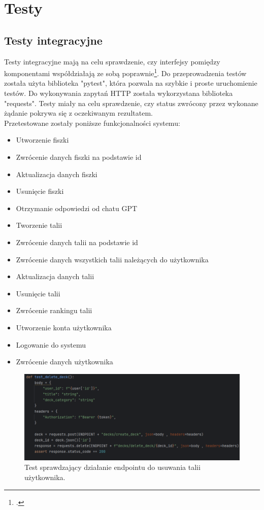 \chapter{Testy}

\section{Testy integracyjne}

Testy integracyjne mają na celu sprawdzenie, czy interfejsy pomiędzy komponentami współdziałają ze sobą poprawnie\footcite[i co tera]{mielnikIntegrationTests}. Do przeprowadzenia testów została użyta biblioteka "pytest", która pozwala na szybkie i proste uruchomienie testów. Do wykonywania zapytań HTTP została wykorzystana biblioteka "requests". Testy miały na celu sprawdzenie, czy status zwrócony przez wykonane żądanie pokrywa się z oczekiwanym rezultatem.\\
Przetestowane zostały poniższe funkcjonalności systemu:

\begin{itemize}
    \item Utworzenie fiszki
    \item Zwrócenie danych fiszki na podstawie id
    \item Aktualizacja danych fiszki
    \item Usunięcie fiszki
    \item Otrzymanie odpowiedzi od chatu GPT
    \item Tworzenie talii
    \item Zwrócenie danych talii na podstawie id
    \item Zwrócenie danych wszystkich talii należących do użytkownika
    \item Aktualizacja danych talii
    \item Usunięcie talii
    \item Zwrócenie rankingu talii
    \item Utworzenie konta użytkownika
    \item Logowanie do systemu
    \item Zwrócenie danych użytkownika
\end{itemize}

\begin{figure}[H]
    \centering
    \includegraphics[width=1\textwidth]{chapters/chapter_9/testy1}
    \caption{Test sprawdzający działanie endpointu do usuwania talii użytkownika.}
    \label{img:testy}
\end{figure}

